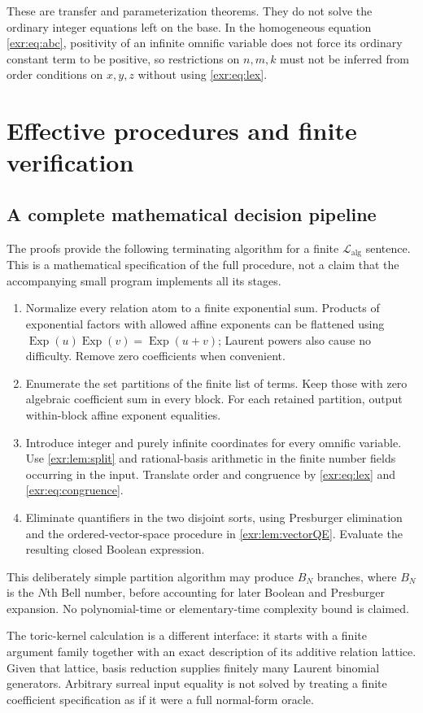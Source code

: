 \documentclass[11pt,letterpaper]{article}
\numberwithin{equation}{section}
\theoremstyle{definition}
\theoremstyle{remark}
\newcommand{\Lalg}{\mathcal L_{\mathrm{alg}}}
\newcommand{\Exp}{\operatorname{Exp}}
\begin{document}
These are transfer and parameterization theorems. They do not solve the ordinary
integer equations left on the base. In the homogeneous equation
\eqref{exr:eq:abc}, positivity of an infinite omnific variable does not force its
ordinary constant term to be positive, so restrictions on $n,m,k$ must not be
inferred from order conditions on $x,y,z$ without using \eqref{exr:eq:lex}.

\section{Effective procedures and finite verification}\label{exr:sec:verification}
\subsection{A complete mathematical decision pipeline}
The proofs provide the following terminating algorithm for a finite $\Lalg$
sentence. This is a mathematical specification of the full procedure, not a claim
that the accompanying small program implements all its stages.
\begin{enumerate}
\item Normalize every relation atom to a finite exponential sum. Products of
exponential factors with allowed affine exponents can be flattened using
$\Exp(u)\Exp(v)=\Exp(u+v)$; Laurent powers also cause no difficulty. Remove zero
coefficients when convenient.
\item Enumerate the set partitions of the finite list of terms. Keep those with
zero algebraic coefficient sum in every block. For each retained partition,
output within-block affine exponent equalities.
\item Introduce integer and purely infinite coordinates for every omnific
variable. Use \cref{exr:lem:split} and rational-basis arithmetic in the finite number
fields occurring in the input. Translate order and congruence by
\eqref{exr:eq:lex} and \eqref{exr:eq:congruence}.
\item Eliminate quantifiers in the two disjoint sorts, using Presburger
elimination and the ordered-vector-space procedure in \cref{exr:lem:vectorQE}.
Evaluate the resulting closed Boolean expression.
\end{enumerate}
This deliberately simple partition algorithm may produce $B_N$ branches, where
$B_N$ is the $N$th Bell number, before accounting for later Boolean and Presburger
expansion. No polynomial-time or elementary-time complexity bound is claimed.

The toric-kernel calculation is a different interface: it starts with a finite
argument family together with an exact description of its additive relation
lattice. Given that lattice, basis reduction supplies finitely many Laurent
binomial generators. Arbitrary surreal input equality is not solved by treating a
finite coefficient specification as if it were a full normal-form oracle.
\end{document}
